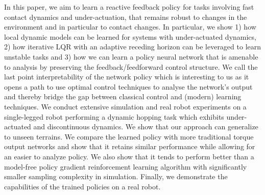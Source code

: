 In this paper, we aim to learn a reactive feedback policy
for tasks involving fast contact dynamics and under-actuation, that remains robust to changes in the environment and
in particular to contact changes.
In particular, we show 1) how local dynamic models can be learned for systems with under-actuated dynamics, 2) how iterative LQR with an adaptive receding horizon can be leveraged to learn unstable tasks and 3) how we can learn a policy neural network that is amenable to analysis by preserving the feedback/feedforward control structure. We call the last point interpretability of the network policy which is interesting to us as it opens a path to use optimal control techniques to analyse the network's output and thereby bridge the gap between classical control and (modern) learning techniques.
We conduct extensive simulation and real robot experiments on a single-legged robot performing a dynamic hopping task which exhibits under-actuated and discontinuous dynamics.
We show that our approach can generalize to unseen terrains. We compare the learned policy with more traditional torque output networks and show that it retains similar performance while allowing for an easier to analyze policy. We also show that it tends to perform better than
a model-free policy gradient reinforcement learning algorithm with significantly smaller sampling complexity in simulation. Finally, we demonstrate the capabilities of the trained policies on a real robot.
%
%
%
%



